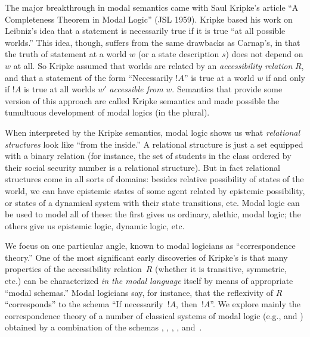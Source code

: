 \documentclass[../../../include/open-logic-section]{subfiles}
\begin{document}
The major breakthrough in modal semantics came with Saul Kripke's
article ``A Completeness Theorem in Modal Logic'' (JSL 1959). Kripke
based his work on Leibniz's idea that a statement is necessarily true
if it is true ``at all possible worlds.'' This idea, though, suffers
from the same drawbacks as Carnap's, in that the truth of statement at
a world $w$ (or a state description $s$) does not depend on $w$ at
all. So Kripke assumed that worlds are related by an
\emph{accessibility relation} $R$, and that a statement of the form
``Necessarily $!A$'' is true at a world $w$ if and only if
$!A$ is true at all worlds $w'$ \emph{accessible from}
$w$. Semantics that provide some version of this approach are called
Kripke semantics and made possible the tumultuous development of modal
logics (in the plural).

When interpreted by the Kripke semantics, modal logic shows us what
\emph{relational structures} look like ``from the inside.'' A
relational structure is just a set equipped with a binary relation
(for instance, the set of students in the class ordered by their
social security number is a relational structure). But in fact
relational structures come in all sorts of domains: besides relative
possibility of states of the world, we can have epistemic states of
some agent related by epistemic possibility, or states of a dynamical
system with their state transitions, etc. Modal logic can be used to
model all of these: the first gives us ordinary, alethic, modal logic;
the others give us epistemic logic, dynamic logic, etc.

We focus on one particular angle, known to modal logicians as
``correspondence theory.'' One of the most significant early
discoveries of Kripke's is that many properties of the accessibility
relation~$R$ (whether it is transitive, symmetric, etc.)  can be
characterized \emph{in the modal language} itself by means of
appropriate ``modal schemas.'' Modal logicians say, for instance, that
the reflexivity of $R$ ``corresponds'' to the schema ``If
necessarily~$!A$, then~$!A$''. We explore mainly the correspondence
theory of a number of classical systems of modal logic (e.g., 
and ) obtained by a combination of the schemas , ,
, , and~.
\end{document}
